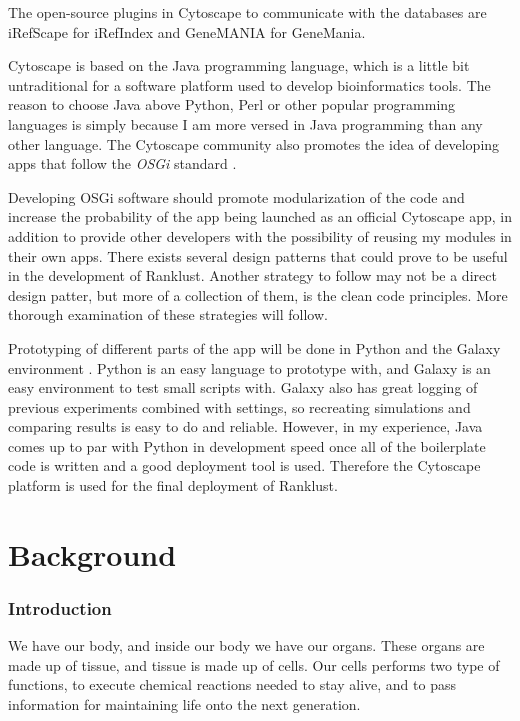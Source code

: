 \documentclass[UKenglish,11pt,a4paper]{article}
\begin{document}
The open-source plugins in Cytoscape to communicate with the databases are iRefScape \cite{iridb} for iRefIndex and 
GeneMANIA \cite{gmdb} for GeneMania.

Cytoscape is based on the Java programming language, which is a little bit untraditional for a software platform used to
develop bioinformatics tools. %
The reason to choose Java above Python, Perl or other popular programming languages is simply because I am more
versed in Java programming than any other language. The Cytoscape community also promotes the idea of developing apps
that follow the \emph{OSGi} standard \cite{cytoscape-osgi}.

Developing OSGi software should promote modularization %
of the code and increase the probability of the app being launched as an official Cytoscape app, in addition to provide
other developers with the possibility of reusing my modules in their own apps. There exists several design patterns that
could prove to be useful in the development of Ranklust. Another strategy to follow may not be a direct design patter,
but more of a collection of them, is the clean code principles. More thorough examination of these strategies will
follow. %

Prototyping of different parts of the app will be done in Python and the Galaxy environment \cite{galaxy}. Python is an 
easy language to prototype with, and Galaxy is an easy environment to test small scripts with. Galaxy also has great 
logging of previous experiments combined with settings, so recreating simulations and comparing results is easy to do and
reliable. However, in my experience, Java comes up to par with Python in development speed once all of the boilerplate
code is written and a good deployment tool is used. Therefore the Cytoscape platform is used for the final deployment of
Ranklust.


\part{Background}
\section*{Introduction}
We have our body, and inside our body we have our organs. These organs are made up of tissue, and tissue is made up of
cells. Our cells performs two type of functions, to execute chemical reactions needed to stay alive, and to pass
information for maintaining life onto the next generation.
\end{document}
